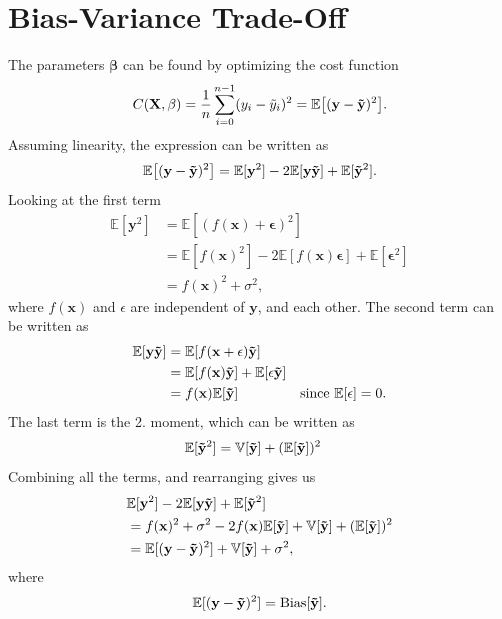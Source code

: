 \section{Bias-Variance Trade-Off}\label{ap:bias_var_eq}
The parameters $\mathbf{\beta}$ can be found by optimizing the cost function
\begin{equation*}
    C(\mathbf{X}, \mathbf{\beta}) = \frac{1}{n} \sum_{i=0}^{n-1} ( y_{i} - \Tilde{y}_{i} )^{2} = \mathbb{E} \big[ ( \mathbf{y} - \mathbf{\Tilde{y}} )^{2} \big] .
\end{equation*}
Assuming linearity, the expression can be written as 
\begin{equation*}
    \mathbb{E} \big[ ( \mathbf{y} - \mathbf{\Tilde{y}} )^{2} \big] = \mathbb{E} [ \mathbf{y}^{2} ] - 2 \mathbb{E} [ \mathbf{y} \mathbf{\Tilde{y}} ] + \mathbb{E} [ \mathbf{\Tilde{y}}^{2} ].
\end{equation*}
Looking at the first term
\begin{align*}
    \mathbb{E} [ \mathbf{y}^{2} ] &= \mathbb{E} [ ( f(\mathbf{x}) + \mathbf{\epsilon} )^{2} ] \\
    &= \mathbb{E} [ f(\mathbf{x})^{2} ] - 2 \mathbb{E} [ f(\mathbf{x}) \mathbf{\epsilon} ] + \mathbb{E} [ \mathbf{\epsilon}^{2} ] \\
    &= f(\mathbf{x})^{2} + \sigma^{2} ,
\end{align*}
where $f(\mathbf{x})$ and $\epsilon$ are independent of $\mathbf{y}$, and each other. The second term can be written as 
\begin{align*}
    \mathbb{E} [ \mathbf{y} \mathbf{\Tilde{y}} ] &= \mathbb{E} [ f(\mathbf{x} + \mathbf{\epsilon}) \mathbf{\Tilde{y}} ] \\
    &= \mathbb{E} [ f(\mathbf{x}) \mathbf{\Tilde{y}} ] + \mathbb{E} [ \epsilon \mathbf{\Tilde{y}} ] \\
    &=  f(\mathbf{x}) \mathbb{E} [ \mathbf{\Tilde{y}} ] & \text{since $\mathbb{E}[\mathbf{\epsilon}] = 0$} .
\end{align*}
The last term is the 2. moment, which can be written as 
\begin{align*}
    \mathbb{E} [ \mathbf{\Tilde{y}}^{2} ] &= \mathbb{V}[\mathbf{\Tilde{y}}] + (\mathbb{E} [ \mathbf{\Tilde{y}} ])^{2} 
\end{align*}
Combining all the terms, and rearranging gives us
\begin{align*}
    &\mathbb{E} [ \mathbf{y}^{2} ] - 2 \mathbb{E} [ \mathbf{y} \mathbf{\Tilde{y}} ] + \mathbb{E} [ \mathbf{\Tilde{y}}^{2} ] \\ 
    &= f(\mathbf{x})^{2} + \sigma^{2} - 2 f(\mathbf{x}) \mathbb{E} [ \mathbf{\Tilde{y}} ] + \mathbb{V}[\mathbf{\Tilde{y}}] + (\mathbb{E} [ \mathbf{\Tilde{y}} ])^{2} \\
    &= \mathbb{E} [ (\mathbf{y} - \mathbf{\Tilde{y}})^{2} ] + \mathbb{V}[\mathbf{\Tilde{y}}] + \sigma^{2} , 
\end{align*}
where 
\begin{align*}
    \mathbb{E} [ (\mathbf{y} - \mathbf{\Tilde{y}})^{2} ] = \text{Bias}[\mathbf{\Tilde{y}}]. 
\end{align*}

